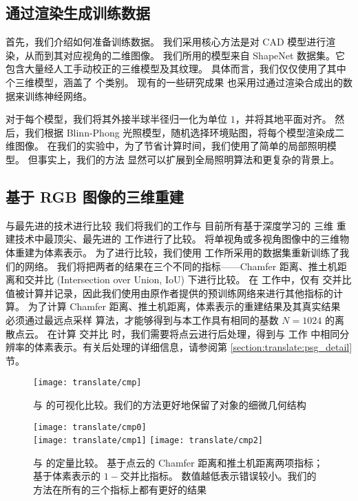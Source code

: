 \subsection{通过渲染生成训练数据}


首先，我们介绍如何准备训练数据。 我们采用核心方法是对 CAD 模型进行渲染，从而到其对应视角的二维图像。
我们所用的模型来自 ShapeNet 数据集\acite{[4]}。它包含大量经人工手动校正的三维模型及其纹理。
具体而言，我们仅仅使用了其中  个三维模型，涵盖了  个类别。
现有的一些研究成果 \acite{[5,19]}%
也采用过通过渲染合成出的数据来训练神经网络。

对于每个模型，我们将其外接半球半径归一化为单位 $1$，并将其地平面对齐。 然后，我们根据 Blinn-Phong 光照模型，随机选择环境贴图，将每个模型渲染成二维图像。 在我们的实验中，为了节省计算时间，我们使用了简单的局部照明模型。
但事实上，我们的方法%
显然可以扩展到全局照明算法和更复杂的背景上。%



\subsection{基于 RGB 图像的三维重建 \label{section:translate:psg_reconrgb}}


{\heiti 与最先进的技术进行比较}
我们将我们的工作与
目前所有基于深度学习的 三维 重建技术中最顶尖、最先进的
\threedrsns
\acite{[5]} 工作进行了比较。
\threedrsns
将单视角或多视角图像中的三维物体重建为体素表示。
为了进行比较，我们使用 \threedrsns 工作所采用的数据集重新训练了我们的网络。 我们将把两者的结果在三个不同的指标——Chamfer 距离、推土机距离和交并比 (Intersection over Union, IoU) 下进行比较。
在 \threedrsns 工作中，仅有 交并比 值被计算并记录，因此我们使用由原作者提供的预训练网络来进行其他指标的计算。
为了计算 Chamfer 距离、推土机距离，体素表示的重建结果及其真实结果
必须通过最远点采样 \acite{[8]} 算法，才能够得到与本工作具有相同的基数 $N = 1024$ 的离散点云。
在计算 交并比 时，我们需要将点云进行后处理，得到与 \threedrsns 工作
中相同分辨率的体素表示。有关后处理的详细信息，请参阅第 \ref{section:translate:psg_detail} 节。

\begin{figure}[h]
	\centering
	\texttt{[image: translate/cmp]}
	\caption[]{与 \threedrsns 的可视化比较。我们的方法更好地保留了对象的细微几何结构}
	\label{fig:translate:cmp}
\end{figure}

\begin{figure}[h]
	\centering
	\hfill\texttt{[image: translate/cmp0]}\\
	\subcaptionbox{\label{fig:translate:cmpqcdemd}}
	{
		\texttt{[image: translate/cmp1]}
	}
	\hspace{2em}
	\subcaptionbox{\label{fig:translate:cmpqiou}}
	{
		\texttt{[image: translate/cmp2]}
	}
	\caption[]{与 \threedrsns 的定量比较。
		 基于点云的 Chamfer 距离和推土机距离两项指标；
		 基于体素表示的 $1 - \text{交并比}$指标。 数值越低表示错误较小。我们的方法在所有的三个指标上都有更好的结果}
	\label{fig:translate:cmpq}
\end{figure}

